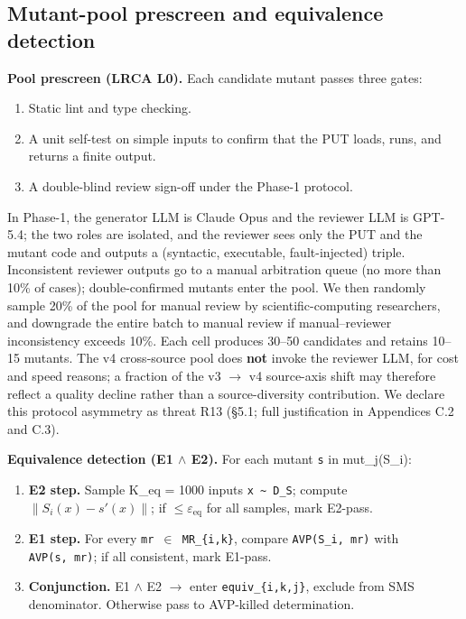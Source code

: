 \documentclass[acmsmall,screen,review]{acmart}
\providecommand{\tightlist}{\setlength{\itemsep}{0pt}\setlength{\parskip}{0pt}}
\begin{document}
\subsection{Mutant-pool prescreen and equivalence detection}\label{mutant-pool-prescreen-and-equivalence-detection}

\textbf{Pool prescreen (LRCA L0).} Each candidate mutant passes three
gates:
\begin{enumerate}
\tightlist
\item Static lint and type checking.
\item A unit self-test on simple inputs to confirm that the PUT loads,
  runs, and returns a finite output.
\item A double-blind review sign-off under the Phase-1 protocol.
\end{enumerate} In Phase-1, the generator LLM is Claude Opus and the reviewer
LLM is GPT-5.4; the two roles are isolated, and the reviewer sees only
the PUT and the mutant code and outputs a (syntactic, executable,
fault-injected) triple. Inconsistent reviewer outputs go to a manual
arbitration queue (no more than 10\% of cases); double-confirmed mutants
enter the pool. We then randomly sample 20\% of the pool for manual
review by scientific-computing researchers, and downgrade the entire
batch to manual review if manual--reviewer inconsistency exceeds 10\%.
Each cell produces 30--50 candidates and retains 10--15 mutants. The v4
cross-source pool does \textbf{not} invoke the reviewer LLM, for cost
and speed reasons; a fraction of the v3 $\to$ v4 source-axis shift may
therefore reflect a quality decline rather than a source-diversity
contribution. We declare this protocol asymmetry as threat R13 (§5.1;
full justification in Appendices C.2 and C.3).

\textbf{Equivalence detection (E1 $\wedge$ E2).} For each mutant
\texttt{s\textquotesingle{}} in mut\_j(S\_i):

\begin{enumerate}
\def\labelenumi{(\alph{enumi})}
\tightlist
\item
  \textbf{E2 step.} Sample K\_eq = 1000 inputs
  \texttt{x\ \textasciitilde{}\ D\_S}; compute
  $\|S_i(x) - s'(x)\|$; if $\leq \varepsilon_{\mathrm{eq}}$ for all
  samples, mark E2-pass.
\item
  \textbf{E1 step.} For every \texttt{mr\ $\in$\ MR\_\{i,k\}}, compare
  \texttt{AVP(S\_i,\ mr)} with \texttt{AVP(s\textquotesingle{},\ mr)};
  if all consistent, mark E1-pass.
\item
  \textbf{Conjunction.} E1 $\wedge$ E2 $\to$ enter \texttt{equiv\_\{i,k,j\}},
  exclude from SMS denominator. Otherwise pass to AVP-killed
  determination.
\end{enumerate}
\end{document}
